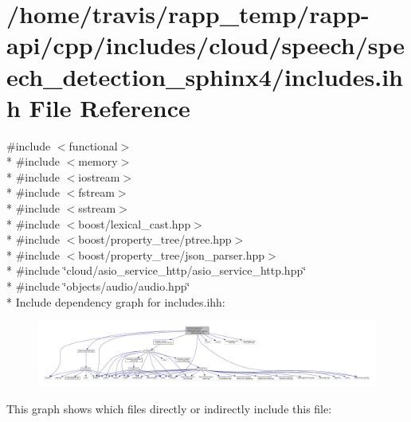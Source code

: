 \hypertarget{cloud_2speech_2speech__detection__sphinx4_2includes_8ihh}{\section{/home/travis/rapp\-\_\-temp/rapp-\/api/cpp/includes/cloud/speech/speech\-\_\-detection\-\_\-sphinx4/includes.ihh File Reference}
\label{cloud_2speech_2speech__detection__sphinx4_2includes_8ihh}
}
{\ttfamily \#include $<$functional$>$}\\*
{\ttfamily \#include $<$memory$>$}\\*
{\ttfamily \#include $<$iostream$>$}\\*
{\ttfamily \#include $<$fstream$>$}\\*
{\ttfamily \#include $<$sstream$>$}\\*
{\ttfamily \#include $<$boost/lexical\-\_\-cast.\-hpp$>$}\\*
{\ttfamily \#include $<$boost/property\-\_\-tree/ptree.\-hpp$>$}\\*
{\ttfamily \#include $<$boost/property\-\_\-tree/json\-\_\-parser.\-hpp$>$}\\*
{\ttfamily \#include \char`\"{}cloud/asio\-\_\-service\-\_\-http/asio\-\_\-service\-\_\-http.\-hpp\char`\"{}}\\*
{\ttfamily \#include \char`\"{}objects/audio/audio.\-hpp\char`\"{}}\\*
Include dependency graph for includes.\-ihh\-:
\nopagebreak
\begin{figure}[H]
\begin{center}
\leavevmode
\includegraphics[width=350pt]{cloud_2speech_2speech__detection__sphinx4_2includes_8ihh__incl}
\end{center}
\end{figure}
This graph shows which files directly or indirectly include this file\-:
\nopagebreak
